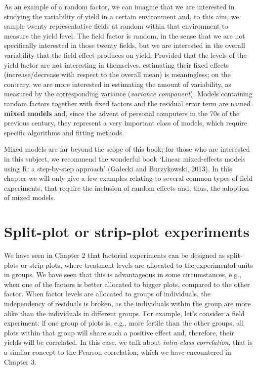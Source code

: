 \documentclass[a4paper,12pt,oneside]{book}
\begin{document}
As an example of a random factor, we can imagine that we are interested in studying the variability of yield in a certain environment and, to this aim, we sample twenty representative fields at random within that environment to measure the yield level. The field factor is random, in the sense that we are not specifically interested in those twenty fields, but we are interested in the overall variability that the field effect produces on yield. Provided that the levels of the yield factor are not interesting in themselves, estimating their fixed effects (increase/decrease with respect to the overall mean) is meaningless; on the contrary, we are more interested in estimating the amount of variability, as measured by the corresponding variance (\emph{variance component}). Models containing random factors together with fixed factors and the residual error term are named \textbf{mixed models} and, since the advent of personal computers in the 70s of the previous century, they represent a very important class of models, which require specific algorithms and fitting methods.

Mixed models are far beyond the scope of this book; for those who are interested in this subject, we recommend the wonderful book `Linear mixed-effects models using R: a step-by-step approach' (Gałecki and Burzykowski, 2013). In this chapter we will only give a few examples relating to several common types of field experiments, that require the inclusion of random effects and, thus, the adoption of mixed models.

\hypertarget{split-plot-or-strip-plot-experiments}{%
\section{Split-plot or strip-plot experiments}\label{split-plot-or-strip-plot-experiments}}

We have seen in Chapter 2 that factorial experiments can be designed as split-plots or strip-plots, where treatment levels are allocated to the experimental units in groups. We have seen that this is advantageous in some circumstances, e.g., when one of the factors is better allocated to bigger plots, compared to the other factor. When factor levels are allocated to groups of individuals, the independency of residuals is broken, as the individuals within the group are more alike than the individuals in different groups. For example, let's consider a field experiment: if one group of plots is, e.g., more fertile than the other groups, all plots within that group will share such a positive effect and, therefore, their yields will be correlated. In this case, we talk about \emph{intra-class correlation}, that is a similar concept to the Pearson correlation, which we have encountered in Chapter 3.
\end{document}
